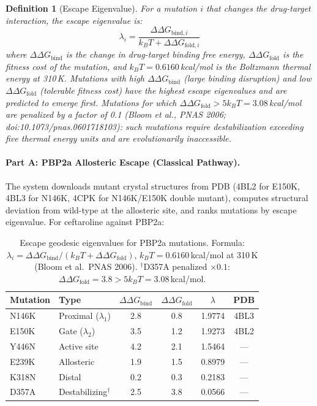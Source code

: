 \documentclass[11pt]{article}
\newtheorem{definition}[theorem]{Definition}
\begin{document}
\begin{definition}[Escape Eigenvalue]
For a mutation $i$ that changes the drug-target interaction, the escape eigenvalue is:
\begin{equation}
\lambda_i = \frac{\Delta\Delta G_{\text{bind},i}}{k_BT + \Delta\Delta G_{\text{fold},i}}
\end{equation}
where $\Delta\Delta G_{\text{bind}}$ is the change in drug-target binding free energy,
$\Delta\Delta G_{\text{fold}}$ is the fitness cost of the mutation, and $k_BT = 0.6160$\,kcal/mol
is the Boltzmann thermal energy at 310\,K. Mutations with high $\Delta\Delta G_{\text{bind}}$
(large binding disruption) and low $\Delta\Delta G_{\text{fold}}$ (tolerable fitness cost)
have the highest escape eigenvalues and are predicted to emerge first. Mutations for which
$\Delta\Delta G_{\text{fold}} > 5k_BT = 3.08$\,kcal/mol are penalized by a factor of 0.1
(Bloom et al., PNAS 2006; doi:10.1073/pnas.0601718103): such mutations require destabilization
exceeding five thermal energy units and are evolutionarily inaccessible.
\end{definition}

\paragraph{Part A: PBP2a Allosteric Escape (Classical Pathway).}
The system downloads mutant crystal structures from PDB (4BL2 for E150K, 4BL3 for N146K,
4CPK for N146K/E150K double mutant), computes structural deviation from wild-type at the
allosteric site, and ranks mutations by escape eigenvalue. For ceftaroline against PBP2a:

\begin{table}[H]
\centering
\caption{Escape geodesic eigenvalues for PBP2a mutations.
  Formula: $\lambda_i = \Delta\Delta G_{\text{bind}} / (k_BT + \Delta\Delta G_{\text{fold}})$,
  $k_BT = 0.6160$\,kcal/mol at 310\,K (Bloom et al.\ PNAS 2006).
  $^\dagger$D357A penalized $\times 0.1$: $\Delta\Delta G_{\text{fold}} = 3.8 > 5k_BT = 3.08$\,kcal/mol.}
\label{tab:escape}
\begin{tabular}{@{}llcccc@{}}
\toprule
\textbf{Mutation} & \textbf{Type} & $\Delta\Delta G_{\text{bind}}$ & $\Delta\Delta G_{\text{fold}}$ & $\lambda$ & \textbf{PDB} \\
\midrule
N146K & Proximal ($\lambda_1$)        & 2.8 & 0.8 & 1.9774 & 4BL3 \\
E150K & Gate ($\lambda_2$)            & 3.5 & 1.2 & 1.9273 & 4BL2 \\
Y446N & Active site                   & 4.2 & 2.1 & 1.5464 & ---  \\
E239K & Allosteric                    & 1.9 & 1.5 & 0.8979 & ---  \\
\midrule
K318N & Distal                        & 0.2 & 0.3 & 0.2183 & ---  \\
D357A & Destabilizing$^\dagger$       & 2.5 & 3.8 & 0.0566 & ---  \\
\bottomrule
\end{tabular}
\end{table}
\end{document}
